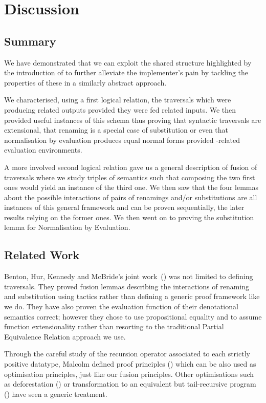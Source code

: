 \chapter{Discussion}

\section{Summary}

We have demonstrated that we can exploit the shared structure highlighted by the
introduction of  to further alleviate the implementer's pain by
tackling the properties of these  in a similarly abstract approach.

We characterised, using a first logical relation, the traversals which were
producing related outputs provided they were fed related inputs. We then provided
useful instances of this schema thus proving that syntactic traversals are
extensional, that renaming is a special case of substitution or even that
normalisation by evaluation produces equal normal forms provided -related
evaluation environments.

A more involved second logical relation gave us a general description of fusion
of traversals where we study triples of semantics such that composing the two
first ones would yield an instance of the third one. We then saw that the four
lemmas about the possible interactions of pairs of renamings and/or substitutions
are all instances of this general framework and can be proven sequentially, the
later results relying on the former ones. We then went on to proving the
substitution lemma for Normalisation by Evaluation.

\section{Related Work}

Benton, Hur, Kennedy and McBride's joint work~(\citeyear{benton2012strongly}) was not
limited to defining traversals. They proved fusion lemmas describing the interactions
of renaming and substitution using tactics rather than defining a generic proof framework
like we do. They have also proven the evaluation function of their denotational semantics
correct; however they chose to use propositional equality and to assume function
extensionality rather than resorting to the traditional Partial Equivalence Relation
approach we use.

Through the careful study of the recursion operator associated to each strictly positive
datatype, Malcolm defined proof principles (\cite{DBLP:journals/scp/Malcolm90}) which can
be also used as optimisation principles, just like our fusion principles. Other
optimisations such as deforestation (\cite{wadler1990deforestation}) or transformation
to an equivalent but tail-recursive program (\cite{TomeCortinas:2018:AAM:3240719.3241787})
have seen a generic treatment.



